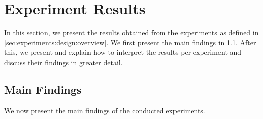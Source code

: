 \section{Experiment Results}
\label{sec:experiments:results}

In this section, we present the results obtained from the experiments as defined in \cref{sec:experiments:design:overview}. We first present the main findings in \cref{sec:experiments:main-findings}. After this, we present and explain how to interpret the results per experiment and discuss their findings in greater detail.




\subsection{Main Findings}
\label{sec:experiments:main-findings}

We now present the main findings of the conducted experiments.

